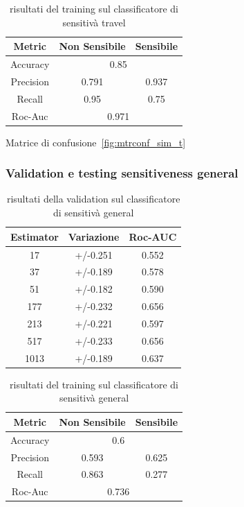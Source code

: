 \begin{table}[h]
\label{tbl:training_sens_travel}
\centering
\begin{tabular}{|c|c|c|}
\hline
\textbf{Metric} & \textbf{Non Sensibile} & \textbf{Sensibile} \\ \hline
Accuracy & \multicolumn{2}{c|}{0.85} \\ \hline
Precision & 0.791 & 0.937 \\ \hline
Recall & 0.95 & 0.75 \\ \hline
Roc-Auc & \multicolumn{2}{c|}{0.971} \\ \hline
\end{tabular}
\caption{risultati del training sul classificatore di sensitivà travel}
\end{table}
\FloatBarrier

Matrice di confusione~\ref{fig:mtrconf_sim_t}

\subsubsection{Validation e testing sensitiveness general}
\label{sssec:val_testing_general}

\begin{table}[h]
\label{tbl:val_sens_general}
\centering
\begin{tabular}{|c|c|c|}
\hline
\textbf{Estimator} & \textbf{Variazione} & \textbf{Roc-AUC} \\ \hline
17 & +/-0.251 & 0.552 \\ \hline
37 & +/-0.189 & 0.578 \\ \hline
51 & +/-0.182 & 0.590 \\ \hline
177 & +/-0.232 & 0.656 \\ \hline
213 & +/-0.221 & 0.597 \\ \hline
517 & +/-0.233 & 0.656 \\ \hline
1013 & +/-0.189 & 0.637 \\ \hline
\end{tabular}
\caption{risultati della validation sul classificatore di sensitivà general}
\end{table}
\FloatBarrier

\begin{table}[h]
\label{tbl:training_sens_general}
\centering
\begin{tabular}{|c|c|c|}
\hline
\textbf{Metric} & \textbf{Non Sensibile} & \textbf{Sensibile} \\ \hline
Accuracy & \multicolumn{2}{c|}{0.6} \\ \hline
Precision & 0.593 & 0.625 \\ \hline
Recall & 0.863 & 0.277 \\ \hline
Roc-Auc & \multicolumn{2}{c|}{0.736} \\ \hline
\end{tabular}
\caption{risultati del training sul classificatore di sensitivà general}
\end{table}
\FloatBarrier

